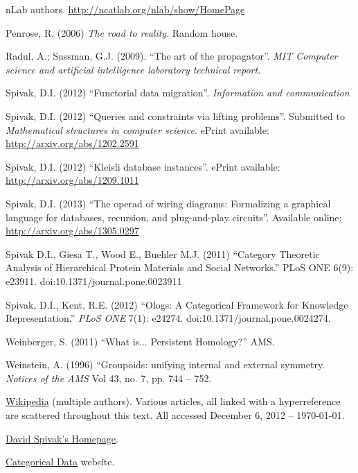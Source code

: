 \documentclass[a4paper]{book}
\theoremstyle{myth}
\begin{document}
\begin{russian}
\begin{thebibliography}{SGWB}
 nLab authors.  \url{http://ncatlab.org/nlab/show/HomePage}

 Penrose, R. (2006) {\em The road to reality}. Random house.

 Radul, A.; Sussman, G.J. (2009). “The art of the propagator”. {\em MIT Computer science and artificial intelligence laboratory technical report.}

 Spivak, D.I. (2012) “Functorial data migration”. {\em Information and communication} 

 Spivak, D.I. (2012) “Queries and constraints via lifting problems”. Submitted to {\em Mathematical structures in computer science}. ePrint available: \url{http://arxiv.org/abs/1202.2591}

 Spivak, D.I. (2012) “Kleisli database instances”. ePrint available: \url{http://arxiv.org/abs/1209.1011}

 Spivak, D.I. (2013) “The operad of wiring diagrams: Formalizing a graphical language for databases, recursion, and plug-and-play circuits”. Available online: \url{http://arxiv.org/abs/1305.0297}

 Spivak D.I., Giesa T., Wood E., Buehler M.J. (2011) “Category Theoretic Analysis of Hierarchical Protein Materials and Social Networks.” PLoS ONE 6(9): e23911. doi:10.1371/journal.pone.0023911

 Spivak, D.I., Kent, R.E. (2012) “Ologs: A Categorical Framework for Knowledge Representation.” {\em PLoS ONE} 7(1): e24274. doi:10.1371/journal.pone.0024274.

 Weinberger, S. (2011) “What is... Persistent Homology?” AMS.

 Weinstein, A. (1996) “Groupoids: unifying internal and external symmetry. {\em Notices of the AMS} Vol 43, no. 7, pp. 744 -- 752.

 \href{http://www.wikipedia.org}{\text Wikipedia} (multiple authors). Various articles, all linked with a hyperreference are scattered throughout this text. All accessed December 6, 2012 -- \today.

 \href{http://math.mit.edu/~dspivak/}{\text David Spivak's Homepage}.

 \href{http://categoricaldata.net/}{\text Categorical Data} website.

\end{thebibliography}
\end{russian}
\end{document}
